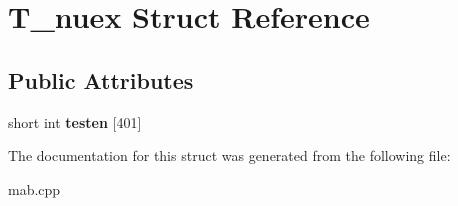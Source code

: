 \hypertarget{structT__nuex}{\section{T\-\_\-nuex Struct Reference}
\label{structT__nuex}
}
\subsection*{Public Attributes}
\begin{DoxyCompactItemize}
\item 
\hypertarget{structT__nuex_a9b27fdca5f3fb081e5880a1e5c258638}{short int {\bfseries testen} \mbox{[}401\mbox{]}}\label{structT__nuex_a9b27fdca5f3fb081e5880a1e5c258638}

\end{DoxyCompactItemize}


The documentation for this struct was generated from the following file\-:\begin{DoxyCompactItemize}
\item 
mab.\-cpp\end{DoxyCompactItemize}
